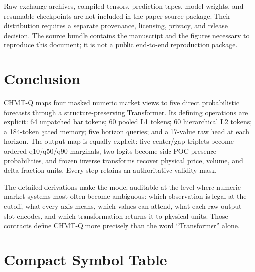 \documentclass[10pt,letterpaper]{article}
\numberwithin{equation}{section}
\theoremstyle{definition}
\theoremstyle{remark}
\begin{document}
Raw exchange archives, compiled tensors, prediction tapes, model weights, and
resumable checkpoints are not included in the paper source package. Their
distribution requires a separate provenance, licensing, privacy, and release
decision. The source bundle contains the manuscript and the figures necessary
to reproduce this document; it is not a public end-to-end reproduction package.

\section{Conclusion}

CHMT-Q maps four masked numeric market views to five direct probabilistic
forecasts through a structure-preserving Transformer. Its defining operations
are explicit: 64 unpatched bar tokens; 60 pooled L1 tokens; 60 hierarchical L2
tokens; a 184-token gated memory; five horizon queries; and a 17-value raw head
at each horizon. The output map is equally explicit: five center/gap triplets
become ordered q10/q50/q90 marginals, two logits become side-POC presence
probabilities, and frozen inverse transforms recover physical price, volume,
and delta-fraction units. Every step retains an authoritative validity mask.

The detailed derivations make the model auditable at the level where numeric
market systems most often become ambiguous: which observation is legal at the
cutoff, what every axis means, which values can attend, what each raw output
slot encodes, and which transformation returns it to physical units. Those
contracts define CHMT-Q more precisely than the word ``Transformer'' alone.

\appendix

\section{Compact Symbol Table}
\end{document}
